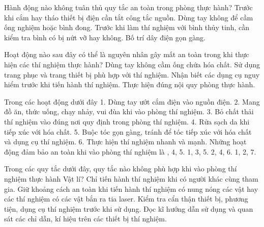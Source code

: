 \begin{ex}
Hành động nào không tuân thủ quy tắc an toàn trong phòng thực hành?
\choice
{Trước khi cắm hay tháo thiết bị điện cần tắt công tắc nguồn.}
{\True Dùng tay không để cầm ống nghiệm hoặc bình đong.}
{Trước khi làm thí nghiệm với bình thủy tinh, cần kiểm tra bình có bị nứt vỡ hay không.}
{Bố trí dây điện gọn gàng.}
\end{ex}

\begin{ex}
Hoạt động nào sau đây có thể là nguyên nhân gây mất an toàn trong khi thực hiện các thí nghiệm thực hành?
\choice
{\True Dùng tay không cầm ống chứa hóa chất.}
{Sử dụng trang phục và trang thiết bị phù hợp với thí nghiệm.}
{Nhận biết các dụng cụ nguy hiểm trước khi tiến hành thí nghiệm.}
{Thực hiện đúng nội quy phòng thực hành.}
\end{ex}

\begin{ex}
Trong các hoạt động dưới đây
1. Dùng tay ướt cắm điện vào nguồn điện.
2. Mang đồ ăn, thức uống, chạy nhảy, vui đùa khi vào phòng thí nghiệm.
3. Bỏ chất thải thí nghiệm vào đúng nơi quy định trong phòng thí nghiệm.
4. Rửa sạch da khi tiếp xúc với hóa chất.
5. Buộc tóc gọn gàng, tránh để tóc tiếp xúc với hóa chất và dụng cụ thí nghiệm.
6. Thực hiện thí nghiệm nhanh và mạnh.
Những hoạt động đảm bảo an toàn khi vào phòng thí nghiệm là
\choice
{, 4, 5.}
{1, 3, 5.}
{2, 4, 6.}
{1, 2, 7.}
\end{ex}



\begin{ex}
Trong các quy tắc dưới đây, quy tắc nào không phù hợp khi vào phòng thí nghiệm thực hành Vật lí?
\choice
{\True Chỉ tiến hành thí nghiệm khi có người khác cùng tham gia.}
{Giữ khoảng cách an toàn khi tiến hành thí nghiệm có nung nóng các vật hay các thí nghiệm có các vật bắn ra tia laser.}
{Kiểm tra cẩn thận thiết bị, phương tiện, dụng cụ thí nghiệm trước khi sử dụng.}
{Đọc kĩ hướng dẫn sử dụng và quan sát các chỉ dẫn, kí hiệu trên các thiết bị thí nghiệm.}
\end{ex}

